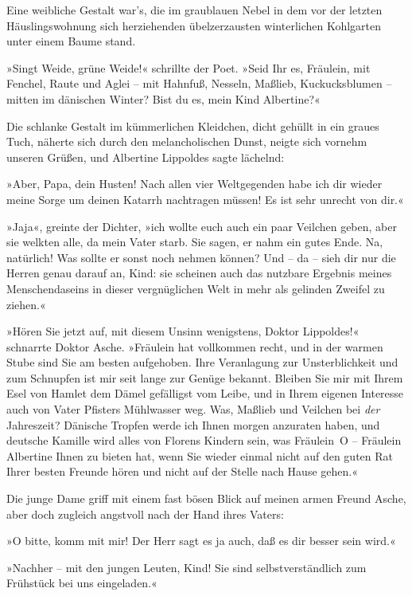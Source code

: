 Eine weibliche Gestalt war's, die im graublauen Nebel in dem vor
der letzten Häuslingswohnung sich herziehenden übelzerzausten
winterlichen Kohlgarten unter einem Baume stand.

»Singt Weide, grüne Weide!« schrillte der Poet. »Seid Ihr es,
Fräulein, mit Fenchel, Raute und Aglei – mit Hahnfuß, Nesseln,
Maßlieb, Kuckucksblumen – mitten im dänischen Winter? Bist du es,
mein Kind Albertine?«

Die schlanke Gestalt im kümmerlichen Kleidchen, dicht gehüllt in
ein graues Tuch, näherte sich durch den melancholischen Dunst,
neigte sich vornehm unseren Grüßen, und Albertine Lippoldes sagte
lächelnd:

»Aber, Papa, dein Husten! Nach allen vier Weltgegenden habe ich dir
wieder meine Sorge um deinen Katarrh nachtragen müssen! Es ist sehr
unrecht von dir.«

»Jaja«, greinte der Dichter, »ich wollte euch auch ein paar
Veilchen geben, aber sie welkten alle, da mein Vater starb. Sie
sagen, er nahm ein gutes Ende. Na, natürlich! Was sollte er sonst
noch nehmen können? Und – da – sieh dir nur die Herren genau darauf
an, Kind: sie scheinen auch das nutzbare Ergebnis meines
Menschendaseins in dieser vergnüglichen Welt in mehr als gelinden
Zweifel zu ziehen.«

»Hören Sie jetzt auf, mit diesem Unsinn wenigstens, Doktor
Lippoldes!« schnarrte Doktor Asche. »Fräulein hat vollkommen recht,
und in der warmen Stube sind Sie am besten aufgehoben. Ihre
Veranlagung zur Unsterblichkeit und zum Schnupfen ist mir seit
lange zur Genüge bekannt. Bleiben Sie mir mit Ihrem Esel von Hamlet
dem Dämel gefälligst vom Leibe, und in Ihrem eigenen Interesse auch
von Vater Pfisters Mühlwasser weg. Was, Maßlieb und Veilchen bei
\emph{der} Jahreszeit? Dänische Tropfen werde ich Ihnen morgen
anzuraten haben, und deutsche Kamille wird alles von Florens
Kindern sein, was Fräulein~O – Fräulein Albertine Ihnen zu bieten
hat, wenn Sie wieder einmal nicht auf den guten Rat Ihrer besten
Freunde hören und nicht auf der Stelle nach Hause gehen.«

Die junge Dame griff mit einem fast bösen Blick auf meinen armen
Freund Asche, aber doch zugleich angstvoll nach der Hand ihres
Vaters:

»O bitte, komm mit mir! Der Herr sagt es ja auch, daß es dir besser
sein wird.«

»Nachher – mit den jungen Leuten, Kind! Sie sind selbstverständlich
zum Frühstück bei uns eingeladen.«

